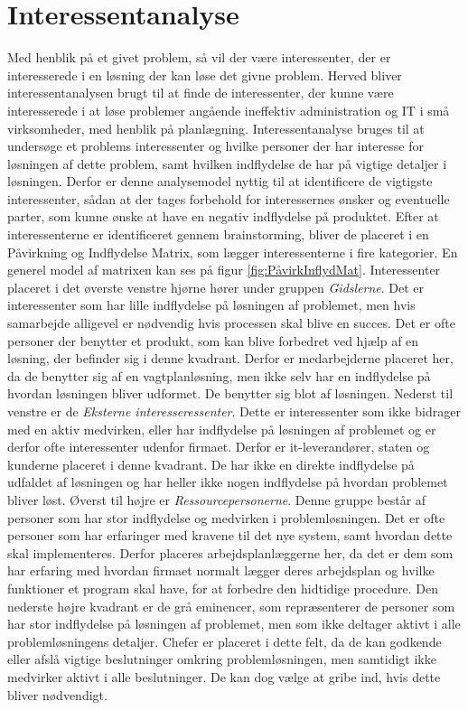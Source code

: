 \section{Interessentanalyse}

Med henblik på et givet problem, så vil der være interessenter, der er interesserede i en løsning der kan løse det givne problem. Herved bliver interessentanalysen brugt til at finde de interessenter, der kunne være interesserede i at løse problemer angående ineffektiv administration og IT i små virksomheder, med henblik på planlægning.
Interessentanalyse bruges til at undersøge et problems interessenter og hvilke personer der har interesse for løsningen af dette problem, samt hvilken indflydelse de har på vigtige detaljer i løsningen. Derfor er denne analysemodel nyttig til at identificere de vigtigste interessenter, sådan at der tages forbehold for interessernes ønsker og eventuelle parter, som kunne ønske at have en negativ indflydelse på produktet. Efter at interessenterne er identificeret gennem brainstorming, bliver de placeret i en Påvirkning og Indflydelse Matrix, som lægger interessenterne i fire kategorier. En generel model af matrixen kan ses på figur \ref{fig:PåvirkInflydMat}. Interessenter placeret i det øverste venstre hjørne hører under gruppen \textit{Gidslerne}. Det er interessenter som har lille indflydelse på løsningen af problemet, men hvis samarbejde alligevel er nødvendig hvis processen skal blive en succes. Det er ofte personer der benytter et produkt, som kan blive forbedret ved hjælp af en løsning, der befinder sig i denne kvadrant. Derfor er medarbejderne placeret her, da de benytter sig af en vagtplanløsning, men ikke selv har en indflydelse på hvordan løsningen bliver udformet. De benytter sig blot af løsningen. Nederst til venstre er de \textit{Eksterne interesseressenter}. Dette er interessenter som ikke bidrager med en aktiv medvirken, eller har indflydelse på løsningen af problemet og er derfor ofte interessenter udenfor firmaet. Derfor er it-leverandører, staten og kunderne placeret i denne kvadrant. De har ikke en direkte indflydelse på udfaldet af løsningen og har heller ikke nogen indflydelse på hvordan problemet bliver løst. Øverst til højre er \textit{Ressourcepersonerne}. Denne gruppe består af personer som har stor indflydelse og medvirken i problemløsningen. Det er ofte personer som har erfaringer med kravene til det nye system, samt hvordan dette skal implementeres. Derfor placeres arbejdsplanlæggerne  her, da det er dem som har erfaring med hvordan firmaet normalt lægger deres arbejdsplan og hvilke funktioner et program skal have, for at forbedre den hidtidige procedure. Den nederste højre kvadrant er de grå eminencer, som repræsenterer de personer som har stor indflydelse på løsningen af problemet, men som ikke deltager aktivt i alle problemløsningens detaljer. Chefer er placeret i dette felt, da de kan godkende eller afslå vigtige beslutninger omkring problemløsningen, men samtidigt ikke medvirker aktivt i alle beslutninger. De kan dog vælge at gribe ind, hvis dette bliver nødvendigt.

